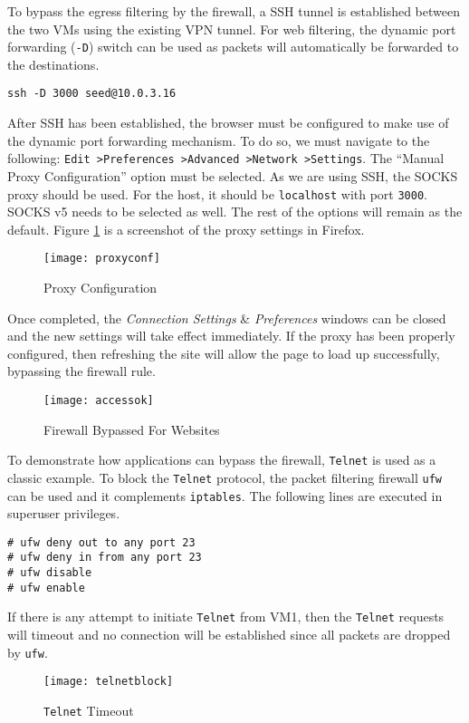 \documentclass[a4paper,12pt]{article}
\begin{document}
To bypass the egress filtering by the firewall, a SSH tunnel is established between the two VMs using the existing VPN tunnel. For web filtering, the dynamic port forwarding (\texttt{-D}) switch can be used as packets will automatically be forwarded to the destinations.
\begin{verbatim}
ssh -D 3000 seed@10.0.3.16
\end{verbatim}
After SSH has been established, the browser must be configured to make use of the dynamic port forwarding mechanism. To do so, we must navigate to the following: \texttt{Edit \textgreater Preferences \textgreater Advanced \textgreater Network \textgreater Settings}. The ``Manual Proxy Configuration'' option must be selected. As we are using SSH, the SOCKS proxy should be used. For the host, it should be \texttt{localhost} with port \texttt{3000}. SOCKS v5 needs to be selected as well. The rest of the options will remain as the default. Figure \ref{fig:proxyconf} is a screenshot of the proxy settings in Firefox.
	\begin{figure}[H]
		\centering
		\texttt{[image: proxyconf]}
		\caption{Proxy Configuration}
		\label{fig:proxyconf}
	\end{figure}
\noindent Once completed, the \textit{Connection Settings} \& \textit{Preferences} windows can be closed and the new settings will take effect immediately. If the proxy has been properly configured, then refreshing the site will allow the page to load up successfully, bypassing the firewall rule.
	\begin{figure}[H]
	\centering
	\texttt{[image: accessok]}
	\caption{Firewall Bypassed For Websites}
	\label{fig:accessok}
	\end{figure}
\noindent To demonstrate how applications can bypass the firewall, \texttt{Telnet} is used as a classic example. To block the \texttt{Telnet} protocol, the packet filtering firewall \texttt{ufw} can be used and it complements \texttt{iptables}. The following lines are executed in superuser privileges.
\begin{verbatim}
# ufw deny out to any port 23
# ufw deny in from any port 23
# ufw disable
# ufw enable
\end{verbatim} 
If there is any attempt to initiate \texttt{Telnet} from VM1, then the \texttt{Telnet} requests will timeout and no connection will be established since all packets are dropped by \texttt{ufw}.
\begin{figure}[H]
\centering
\texttt{[image: telnetblock]}
\caption{\texttt{Telnet} Timeout}
\label{fig:telnetblock}
\end{figure}
\end{document}
